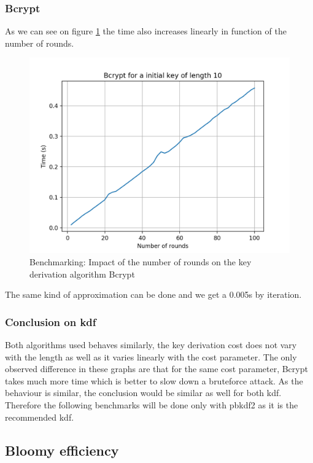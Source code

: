 \documentclass{eplmastersthesis}
\begin{document}
\subsubsection{Bcrypt}
As we can see on figure \ref{benchmarking:TimeBcrypt} the time also increases linearly in function of the number of rounds.
\begin{figure}[h!]
\begin{center}
	\includegraphics[scale=0.6]{res/TimeBcrypt}
	\caption{Benchmarking: Impact of the number of rounds on the key derivation algorithm Bcrypt}
	\label{benchmarking:TimeBcrypt}
\end{center}
\end{figure}
The same kind of approximation can be done and we get a 0.005s by iteration.
\subsubsection*{Conclusion on \gls{kdf}}
Both algorithms used behaves similarly, the key derivation cost does not vary with the length as well as it varies linearly with the cost parameter.
The only observed difference in these graphs are that for the same cost parameter, Bcrypt takes much more time which is better to slow down a bruteforce attack.
As the behaviour is similar, the conclusion would be similar as well for both \gls{kdf}. Therefore the following benchmarks will be done only with \gls{pbkdf2} as it is the recommended \gls{kdf}.

\subsection{Bloomy efficiency}
\label{sec:BloomyEfficiency}
\end{document}
